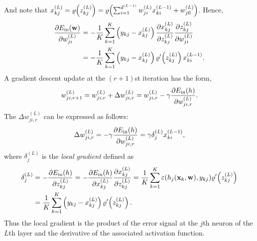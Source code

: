 And note that $x_{kj}^{(L)}=\varrho\!\left(z_{kj}^{(L)}\right)=\varrho\!\left(\sum_{i=1}^{d^{(L-1)}}w_{ji}^{(L)}x_{ki}^{(L-1)}+w_{j0}^{(L)}\right)$. Hence,
\begin{align}
\frac{\partial E_{\mathrm{in}}(\mathbf{w})}{\partial w_{ji}^{(L)}}&=-\frac{1}{K}\sum_{k=1}^{K}\left(y_{kj}-x_{kj}^{(L)}\right)\frac{\partial x_{kj}^{(L)}}{\partial z_{kj}^{(L)}}\frac{\partial z_{kj}^{(L)}}{\partial w_{ji}^{(L)}}\nonumber\\
&=-\frac{1}{K}\sum_{k=1}^{K}\left(y_{kj}-x_{kj}^{(L)}\right)\varrho'\!\left(z_{kj}^{(L)}\right)x_{ki}^{(L-1)}.\label{eq:grad1}
\end{align}
A gradient descent update at the $(r+1)$st iteration has the form,
\begin{equation}
w_{ji,r+1}^{(L)}=w_{ji,r}^{(L)}+\Delta w_{ji,r}^{(L)}=w_{ji,r}^{(L)}-\gamma\frac{\partial E_{\mathrm{in}}(h)}{\partial w_{ji,r}^{(L)}}.
\end{equation}
The $\Delta w_{ji,r}^{(L)}$ can be expressed as follows:
\begin{equation}
\Delta w_{ji,r}^{(L)}=-\gamma\frac{\partial E_{\mathrm{in}}(h)}{\partial w_{ji,r}^{(L)}}=\gamma\delta_{j}^{(L)}x_{ki}^{(L-1)},
\end{equation}
where $\delta_{j}^{(L)}$ is the \textit{local gradient} defined as
\begin{align}
\delta_{j}^{(L)}&=-\frac{\partial E_{\mathrm{in}}(h)}{\partial z_{kj}^{(L)}}=-\frac{\partial E_{\mathrm{in}}(h)}{\partial x_{kj}^{(L)}}\frac{\partial x_{kj}^{(L)}}{\partial z_{kj}^{(L)}}=\frac{1}{K}\sum_{k=1}^{K}\varepsilon(h_j(\mathbf{x}_k,\mathbf{w}),y_{kj})\varrho'\!\left(z_{kj}^{(L)}\right)\nonumber\\
&=\frac{1}{K}\sum_{k=1}^{K}\left(y_{kj}-x_{kj}^{(L)}\right)\varrho'\!\left(z_{kj}^{(L)}\right).
\end{align}
Thus the local gradient is the product of the error signal at the $j$th neuron of the $L$th layer and the derivative of the associated activation function.


